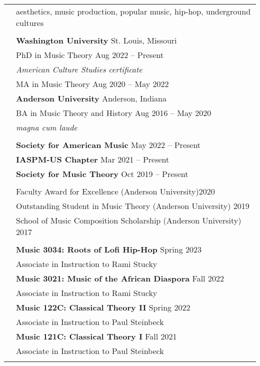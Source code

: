 \documentclass[letterpaper, 11pt]{article}
\begin{document}
\begin{longtable}{p{1.3in}p{4.8in}}

\nohyphens{\color{OliveGreen}{Research interests}}
& aesthetics, music production, popular music, hip-hop, underground cultures \\
& \\

\color{OliveGreen}{Education} 
& \textbf{Washington University} \hfill St. Louis, Missouri \\
& PhD in Music Theory \hfill Aug 2022 -- Present \\
& \textit{American Culture Studies certificate} \\
& MA in Music Theory \hfill Aug 2020 -- May 2022\\

& \textbf{Anderson University} \hfill Anderson, Indiana \\
& BA in Music Theory and History \hfill Aug 2016 -- May 2020 \\
& {\it magna cum laude}\\
&\\

{\color{OliveGreen}{Memberships}} 
& \textbf{Society for American Music} \hfill May 2022 -- Present \\
& \textbf{IASPM-US Chapter} \hfill Mar 2021 -- Present \\
& \textbf{Society for Music Theory} \hfill Oct 2019 -- Present \\
& \\

{\color{OliveGreen}{Honors \&}}
& Faculty Award for Excellence (Anderson University)\hfill 2020 \\
{\color{OliveGreen}{Scholarships}} 
& Outstanding Student in Music Theory (Anderson University) \hfill 2019 \\
& School of Music Composition Scholarship (Anderson University) \hfill 2017\\
& \\

{\color{OliveGreen}{Courses Taught}} 
& \textbf{Music 3034: Roots of Lofi Hip-Hop} \hfill Spring 2023 \\
& Associate in Instruction to Rami Stucky \\
& \textbf{Music 3021: Music of the African Diaspora} \hfill Fall 2022 \\
& Associate in Instruction to Rami Stucky \\
& \textbf{Music 122C: Classical Theory II} \hfill Spring 2022 \\
& Associate in Instruction to Paul Steinbeck \\
& \textbf{Music 121C: Classical Theory I} \hfill Fall 2021 \\
& Associate in Instruction to Paul Steinbeck \\
& \\


\end{longtable}
\end{document}
